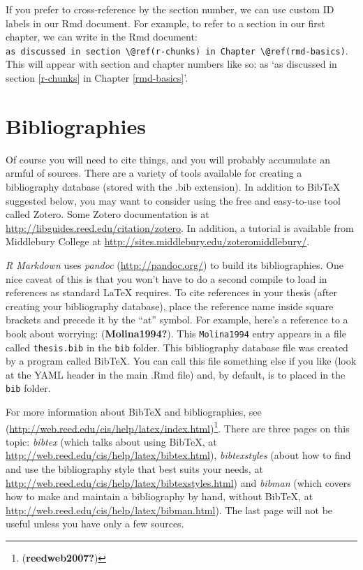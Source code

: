 \documentclass[print]{nuthesis}
\begin{document}
If you prefer to cross-reference by the section number, we can use custom ID labels in our Rmd document. For example, to refer to a section in our first chapter, we can write in the Rmd document: \texttt{as\ discussed\ in\ section\ \textbackslash{}@ref(r-chunks)\ in\ Chapter\ \textbackslash{}@ref(rmd-basics)}. This will appear with section and chapter numbers like so: as `as discussed in section \ref{r-chunks} in Chapter \ref{rmd-basics}'.

\hypertarget{bibliographies}{%
\section{Bibliographies}\label{bibliographies}}

Of course you will need to cite things, and you will probably accumulate an armful of sources. There are a variety of tools available for creating a bibliography database (stored with the .bib extension). In addition to BibTeX suggested below, you may want to consider using the free and easy-to-use tool called Zotero. Some Zotero documentation is at \url{http://libguides.reed.edu/citation/zotero}. In addition, a tutorial is available from Middlebury College at \url{http://sites.middlebury.edu/zoteromiddlebury/}.

\emph{R Markdown} uses \emph{pandoc} (\url{http://pandoc.org/}) to build its bibliographies. One nice caveat of this is that you won't have to do a second compile to load in references as standard LaTeX requires. To cite references in your thesis (after creating your bibliography database), place the reference name inside square brackets and precede it by the ``at'' symbol. For example, here's a reference to a book about worrying: (\textbf{Molina1994?}). This \texttt{Molina1994} entry appears in a file called \texttt{thesis.bib} in the \texttt{bib} folder. This bibliography database file was created by a program called BibTeX. You can call this file something else if you like (look at the YAML header in the main .Rmd file) and, by default, is to placed in the \texttt{bib} folder.

For more information about BibTeX and bibliographies, see (\url{http://web.reed.edu/cis/help/latex/index.html})\footnote{(\textbf{reedweb2007?})}. There are three pages on this topic: \emph{bibtex} (which talks about using BibTeX, at \url{http://web.reed.edu/cis/help/latex/bibtex.html}), \emph{bibtexstyles} (about how to find and use the bibliography style that best suits your needs, at \url{http://web.reed.edu/cis/help/latex/bibtexstyles.html}) and \emph{bibman} (which covers how to make and maintain a bibliography by hand, without BibTeX, at \url{http://web.reed.edu/cis/help/latex/bibman.html}). The last page will not be useful unless you have only a few sources.
\end{document}
